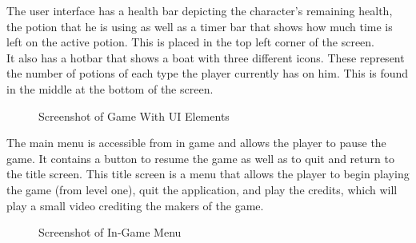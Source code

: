 \documentclass{article}
\begin{document}
The user interface has a health bar depicting the character's remaining health, the potion that he is using as well as a timer bar that shows how much time is left on the active potion. This is placed in the top left corner of the screen.\\

It also has a hotbar that shows a boat with three different icons. These represent the number of potions of each type the player currently has on him. This is found in the middle at the bottom of the screen.

 \begin{figure}[!htb]
  \caption {Screenshot of Game With UI Elements}
  \end{figure}

The main menu is accessible from in game and allows the player to pause the game. It contains a button to resume the game as well as to quit and return to the title screen. This title screen is a menu that allows the player to begin playing the game (from level one), quit the application, and play the credits, which will play a small video crediting the makers of the game.

\begin{figure}[!htb]
  \caption {Screenshot of In-Game Menu}
  \end{figure}
\end{document}
